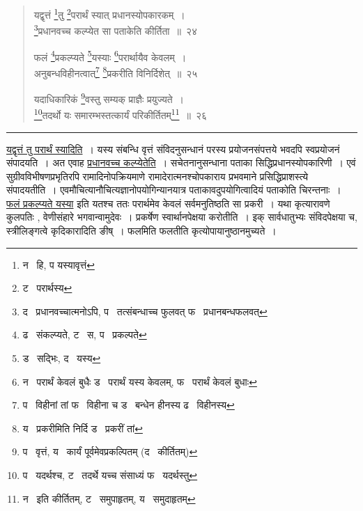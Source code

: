 \documentclass[11pt, openany]{book}
\begin{document}
\begin{quote}
{\na यद्वृत्तं \renewcommand{\thefootnote}{1}\footnote{न \textendash\ हि, प यस्यावृत्तं}तु \renewcommand{\thefootnote}{2}\footnote{ट \textendash\ परार्थस्य}परार्थं स्यात् प्रधानस्योपकारकम्~।\\
\renewcommand{\thefootnote}{3}\footnote{द \textendash\ प्रधानवच्चात्मनोऽपि, प \textendash\ तत्संबन्धाच्च फुलवत् फ \textendash\ प्रधानबन्धफलवत्}प्रधानवच्च कल्प्येत सा पताकेति कीर्तिता~॥~२४

फलं \renewcommand{\thefootnote}{4}\footnote{ढ \textendash\ संकल्प्यते, ट \textendash\ स, प \textendash\ प्रकल्पते}प्रकल्प्यते \renewcommand{\thefootnote}{5}\footnote{ड \textendash\ सद्भिः, द \textendash\ यस्य}यस्याः \renewcommand{\thefootnote}{6}\footnote{न \textendash\ परार्थं केवलं बुधैः ड \textendash\ परार्थं यस्य केवलम्, फ \textendash\ परार्थं केवलं बुधाः}परार्थायैव केवलम्~।\\
अनुबन्धविहीनत्वात्\renewcommand{\thefootnote}{7}\footnote{प \textendash\ विहीनां तां फ \textendash\ विहीना च ड \textendash\ बन्धेन हीनस्य ढ \textendash\ विहीनस्य} \renewcommand{\thefootnote}{8}\footnote{य \textendash\ प्रकरीमिति निर्दि ड \textendash\ प्रकरीं तां}प्रकरीति विनिर्दिशेत्~॥~२५

यदाधिकारिकं \renewcommand{\thefootnote}{9}\footnote{प \textendash\ वृत्तं, य \textendash\ कार्यं पूर्वमेवप्रकल्पितम् (द \textendash\ कीर्तितम्)}वस्तु सम्यक् प्राज्ञैः प्रयुज्यते~।\\
\renewcommand{\thefootnote}{10}\footnote{प \textendash\ यदर्थश्च, ट \textendash\ तदर्थे यच्च संसाध्यं फ \textendash\ यदर्थस्तु}तदर्थो यः समारम्भस्तत्कार्यं परिकीर्तितम्\renewcommand{\thefootnote}{11}\footnote{न \textendash\ इति कीर्तितम्, ट \textendash\ समुपाहृतम्, य \textendash\ समुदाहृतम्}~॥~२६}
\end{quote}

\hrule

\vspace{2mm}
\underline{यद्वृत्तं तु परार्थं स्यादिति}~। यस्य संबन्धि वृत्तं संविदनुसन्धानं परस्य प्रयोजनसंपत्तये भवदपि स्वप्रयोजनं संपादयति~। अत एवाह \underline{प्रधानवच्च कल्प्येतेति}~। सचेतनानुसन्धाना पताका सिद्धिप्रधानस्योपकारिणी~। एवं सुग्रीवविभीषणप्रभृतिरपि रामादिनोपक्रियमाणे रामादेरात्मनश्चोपकाराय प्रभवमाने प्रसिद्धिप्राशस्त्ये संपादयतीति~। एवमौचित्यानौचित्यज्ञानोपयोगिन्यानयात्र पताकावदुपयोगित्वादियं पताकोति चिरन्तनाः~।\\

\underline{फलं प्रकल्प्यते यस्या} इति यतश्च ततः परार्थमेव केवलं सर्वमनुतिष्ठति सा प्रकरी~। यथा कृत्यारावणे कुलपतिः , वेणीसंहारे भगवान्वामुदेवः~। प्रकर्षेण स्वार्थानपेक्षया करोतीति~। इक् सार्वधातुभ्यः संविदपेक्षया च, स्त्रीलिङ्गत्वे कृदिकारादिति ङीष्~। फलमिति फलतीति कृत्योपायानुष्ठानमुच्यते~।\\
\end{document}
